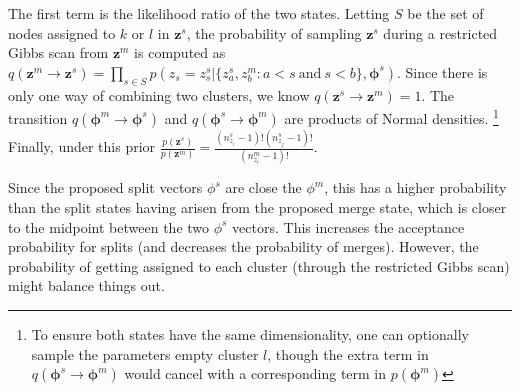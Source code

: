 \documentclass{article}
\begin{document}
The first term is the likelihood ratio of the two states.  Letting $S$ be the set of nodes assigned to $k$ or $l$ in $\mathbf{z}^{s}$, the probability of sampling $\mathbf{z}^{s}$ during a restricted Gibbs scan from  $\mathbf{z}^{m}$ is computed as $q( \mathbf{z}^{m} \rightarrow \mathbf{z}^{s}) = \prod_{s \in S} p(z_{s}=z_s^{s} |\{ z_a^{s},z_{b}^{m}: a  < s \ \mbox{and} \ s < b\}, \boldsymbol{\phi}^{s})$.  Since there is only one way of combining two clusters, we know $q(\mathbf{z}^{s} \rightarrow \mathbf{z}^{m})=1$.   The transition $q(\boldsymbol{\phi}^{m} \rightarrow \boldsymbol{\phi}^{s})$ and 
$q(\boldsymbol{\phi}^{s} \rightarrow
\boldsymbol{\phi}^{m})$ are products of Normal densities. \footnote{To ensure both states have the same dimensionality, one can optionally sample the parameters empty cluster $l$, though the extra term  in $q(\boldsymbol{\phi}^{s} \rightarrow \boldsymbol{\phi}^{m})$ would cancel with a corresponding term in $p(\boldsymbol{\phi}^{m})$}  Finally, under this prior $ \frac{p(\mathbf{z}^{s})}{p(\mathbf{z}^{m})} = \frac{(n_{z_i}^{s} - 1)!(n_{z_j}^{s} - 1)!}{(n_{z_i}^{m}-1)!}$.  

Since the proposed split vectors $\phi^s$ are close the $\phi^m$, this has a higher probability than the split states having arisen from the proposed merge state, which is closer to the midpoint between the two $\phi^s$ vectors.  This increases the acceptance probability for splits (and decreases the probability of merges).  However, the probability of getting assigned to each cluster (through the restricted Gibbs scan) might balance things out.

\spewnotes
\end{document}
